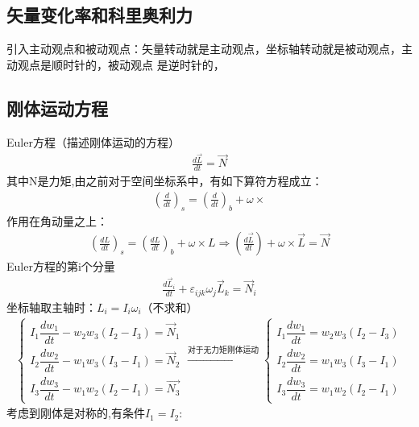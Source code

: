 \documentclass[UTF8,10pt]{article}
\begin{document}
\subsection{矢量变化率和科里奥利力}
引入主动观点和被动观点：矢量转动就是主动观点，坐标轴转动就是被动观点，主动观点是顺时针的，被动观点
是逆时针的，

\subsection{刚体运动方程}
Euler方程（描述刚体运动的方程）
\begin{align*}
    \frac{d\vec{L}}{dt}=\vec{N}
\end{align*}
其中N是力矩,由之前对于空间坐标系中，有如下算符方程成立：
\begin{align*}
    \left(\frac{d}{dt}\right)_s =\left(\frac{d}{dt}\right)_b+\omega\times
\end{align*}
作用在角动量之上：
\begin{align*}
    \left(\frac{dL}{dt}\right)_s=\left(\frac{dL}{dt}\right)_b+\omega\times L\Rightarrow \left(\frac{d\vec{L}}{dt}\right)+\omega\times \vec{L}=\vec{N}
\end{align*}
Euler方程的第i个分量
\begin{align*}
    \frac{d\vec{L}_i}{dt}+\varepsilon_{ijk}\omega_j\vec{L}_k=\vec{N}_i
\end{align*}
坐标轴取主轴时：$L_i=I_i\omega_i$（不求和）
\begin{gather*}
    \begin{cases}
        I_{1} \dfrac{d w_{1}}{d t}-w_{2} w_{3}\left(I_{2}-I_{3}\right)=\vec{N}_{1} \\[0.3cm]
        I_{2} \dfrac{d w_{2}}{d t}-w_{1} w_{3}\left(I_{3}-I_{1}\right)=\vec{N}_{2} \\[0.3cm]
        I_{3} \dfrac{d w_{3}}{d t}-w_{1} w_{2}\left(I_{2}-I_{1}\right)=\vec{N_{3}}
    \end{cases}
    \xrightarrow{\text{对于无力矩刚体运动}}
    \begin{cases}
        I_{1} \dfrac{d w_{1}}{d t}=w_{2} w_{3}\left(I_{2}-I_{3}\right) \\[0.5cm]
        I_{2} \dfrac{d w_{2}}{d t}=w_{1} w_{3}\left(I_{3}-I_{1}\right) \\[0.5cm]
        I_{3} \dfrac{d w_{3}}{d t}=w_{1} w_{2}\left(I_{2}-I_{1}\right)
    \end{cases}
\end{gather*}
考虑到刚体是对称的,有条件$I_1=I_2$:
\end{document}
